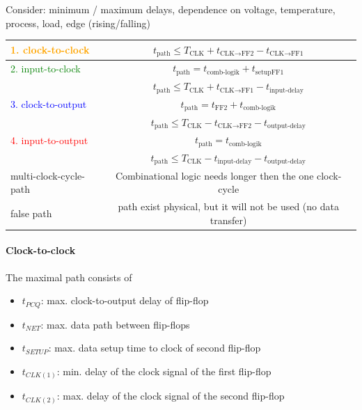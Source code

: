 Consider: minimum / maximum delays, dependence on voltage, temperature, process, load, edge (rising/falling)

\begin{table}[!h]
	\centering
	\begin{tabular}{|l|c|}
		\hline
		\textcolor{orange}{1. clock-to-clock} & $t_{\text{path}} \leq T_{\text{CLK}} + t_{\text{CLK} \rightarrow \text{FF2}} - t_{\text{CLK} \rightarrow \text{FF1}}$ \\ \hline
		\textcolor{green}{2. input-to-clock}  &                           $t_{\text{path}} = t_{\text{comb-logik}} + t_{\text{setupFF1}} $                            \\
		                                      &        $t_{\text{path}} \leq T_{\text{CLK}} + t_{\text{CLK} \rightarrow \text{FF1}} - t_{\text{input-delay}}$         \\ \hline
		\textcolor{blue}{3. clock-to-output}  &                              $t_{\text{path}} = t_{\text{FF2}} + t_{\text{comb-logik}}$                               \\
		                                      &        $t_{\text{path}} \leq T_{\text{CLK}} - t_{\text{CLK} \rightarrow \text{FF2}} - t_{\text{output-delay}}$        \\ \hline
		\textcolor{red}{4. input-to-output}   &                                      $t_{\text{path}} = t_{\text{comb-logik}} $                                       \\
		                                      &               $t_{\text{path}} \leq T_{\text{CLK}} - t_{\text{input-delay}} - t_{\text{output-delay}} $               \\ \hline
		multi-clock-cycle-path                &                               Combinational logic needs longer then the one clock-cycle                               \\ \hline
		false path                            &                            path exist physical, but it will not be used (no data transfer)                            \\ \hline
	\end{tabular}
\end{table}

\paragraph{Clock-to-clock}The maximal path consists of 
\begin{itemize}
    \item $t_{PCQ}$: max. clock-to-output delay of flip-flop
    \item $t_{NET}$: max. data path between flip-flops
    \item $t_{SETUP}$: max. data setup time to clock of second flip-flop 
    \item $t_{CLK(1)}$: min. delay of the clock signal of the first flip-flop
    \item $t_{CLK(2)}$: max. delay of the clock signal of the second flip-flop
\end{itemize}

